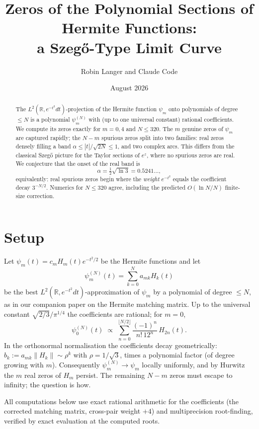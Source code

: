 \documentclass[11pt]{article}
\title{Zeros of the Polynomial Sections of Hermite Functions:\\
a Szeg\H{o}-Type Limit Curve}
\author{Robin Langer and Claude Code}
\date{August 2026}
\theoremstyle{remark}
\newcommand{\R}{\mathbb{R}}
\begin{document}
\maketitle

\begin{abstract}
The $L^2(\R, e^{-t^2}dt)$-projection of the Hermite function $\psi_m$ onto polynomials of degree $\le N$ is a polynomial $\psi_m^{(N)}$ with (up to one universal constant) rational coefficients. We compute its zeros exactly for $m = 0, 4$ and $N \le 320$. The $m$ genuine zeros of $\psi_m$ are captured rapidly; the $N - m$ spurious zeros split into two families: real zeros densely filling a band $\alpha \le |t|/\sqrt{2N} \le 1$, and two complex arcs. This differs from the classical Szeg\H{o} picture for the Taylor sections of $e^z$, where no spurious zeros are real. We conjecture that the onset of the real band is
\[
\alpha = \tfrac{1}{2}\sqrt{\ln 3} = 0.5241\ldots,
\]
equivalently: real spurious zeros begin where the \emph{weight} $e^{-t^2}$ equals the coefficient decay $3^{-N/2}$. Numerics for $N \le 320$ agree, including the predicted $O(\ln N / N)$ finite-size correction.
\end{abstract}

\section{Setup}

Let $\psi_m(t) = c_m H_m(t) e^{-t^2/2}$ be the Hermite functions and let
\[
\psi_m^{(N)}(t) = \sum_{k=0}^{N} a_{mk} H_k(t)
\]
be the best $L^2(\R, e^{-t^2}dt)$-approximation of $\psi_m$ by a polynomial of degree $\le N$, as in our companion paper on the Hermite matching matrix. Up to the universal constant $\sqrt{2/3}/\pi^{1/4}$ the coefficients are rational; for $m = 0$,
\begin{equation}
\psi_0^{(N)}(t) \;\propto\; \sum_{n=0}^{\lfloor N/2 \rfloor} \frac{(-1)^n}{n!\, 12^n}\, H_{2n}(t).
\label{eq:m0}
\end{equation}
In the orthonormal normalisation the coefficients decay geometrically: $b_k := a_{mk}\|H_k\| \sim \rho^k$ with $\rho = 1/\sqrt{3}$, times a polynomial factor (of degree growing with $m$). Consequently $\psi_m^{(N)} \to \psi_m$ locally uniformly, and by Hurwitz the $m$ real zeros of $H_m$ persist. The remaining $N - m$ zeros must escape to infinity; the question is how.

All computations below use exact rational arithmetic for the coefficients (the corrected matching matrix, cross-pair weight $+4$) and multiprecision root-finding, verified by exact evaluation at the computed roots.
\end{document}

